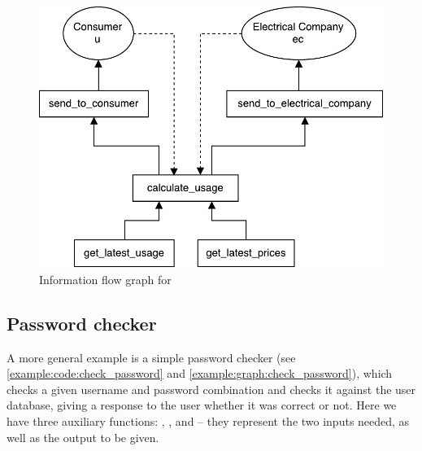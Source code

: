 
\begin{figure}
  \centering
  \includegraphics[scale=0.8]{figures/dlm_calculate_bill}
  \caption{Information flow graph for }
  \label{example:graph:calculate_bill}
\end{figure}

\subsection{Password checker}\label{example:sec:check_password}
A more general example is a simple password checker (see \cref{example:code:check_password} and \cref{example:graph:check_password}), which checks a given username and password combination and checks it against the user database, giving a response to the user whether it was correct or not.
Here we have three auxiliary functions: , , and  -- they represent the two inputs needed, as well as the output to be given.

